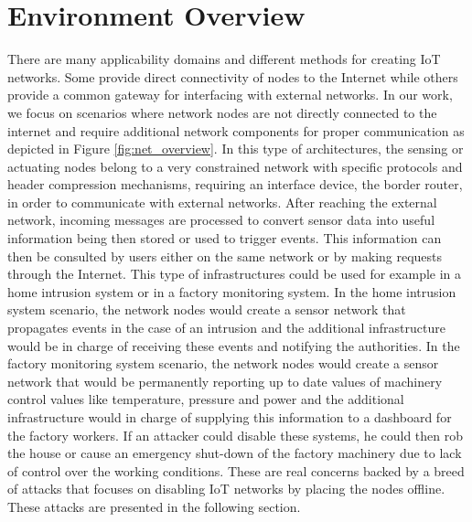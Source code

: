 \documentclass{sig-alternate-05-2015}
\begin{document}
\section{Environment Overview}
\label{sec:network_overview}
There are many applicability domains and different methods for creating \gls{IoT} networks. Some provide direct connectivity of nodes to the Internet while others provide a common gateway for interfacing with external networks. In our work, we focus on scenarios where network nodes are not directly connected to the internet and require additional network components for proper communication as depicted in Figure \ref{fig:net_overview}.
In this type of architectures, the sensing or actuating nodes belong to a very constrained network with specific protocols and header compression mechanisms, requiring an interface device, the border router, in order to communicate with external networks. After reaching the external network, incoming messages are processed to convert sensor data into useful information being then stored or used to trigger events. This information can then be consulted by users either on the same network or by making requests through the Internet. This type of infrastructures could be used for example in a home intrusion system or in a factory monitoring system. In the home intrusion system scenario, the network nodes would create a sensor network that propagates events in the case of an intrusion and the additional infrastructure would be in charge of receiving these events and notifying the authorities. In the factory monitoring system scenario, the network nodes would create a sensor network that would be permanently reporting up to date values of machinery control values like temperature, pressure and power and the additional infrastructure would in charge of supplying this information to a dashboard for the factory workers. If an attacker could disable these systems, he could then rob the house or cause an emergency shut-down of the factory machinery due to lack of control over the working conditions. These are real concerns backed by a breed of attacks that focuses on disabling \gls{IoT} networks by placing the nodes offline. These attacks are presented in the following section.
\end{document}

